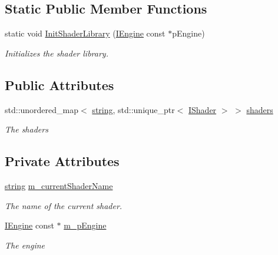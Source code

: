 \subsection*{Static Public Member Functions}
\begin{DoxyCompactItemize}
\item 
static void \hyperlink{struct_shader_library_ac5a116b42faf885357d2118f91d5bb39}{Init\+Shader\+Library} (\hyperlink{class_i_engine}{I\+Engine} const $\ast$p\+Engine)
\begin{DoxyCompactList}\small\item\em Initializes the shader library. \end{DoxyCompactList}\end{DoxyCompactItemize}
\subsection*{Public Attributes}
\begin{DoxyCompactItemize}
\item 
std\+::unordered\+\_\+map$<$ \hyperlink{_types_8h_ad453f9f71ce1f9153fb748d6bb25e454}{string}, std\+::unique\+\_\+ptr$<$ \hyperlink{class_i_shader}{I\+Shader} $>$ $>$ \hyperlink{struct_shader_library_a97d6d708c2c947faefadf03ba1089f01}{shaders}
\begin{DoxyCompactList}\small\item\em The shaders \end{DoxyCompactList}\end{DoxyCompactItemize}
\subsection*{Private Attributes}
\begin{DoxyCompactItemize}
\item 
\hyperlink{_types_8h_ad453f9f71ce1f9153fb748d6bb25e454}{string} \hyperlink{struct_shader_library_a26d1faccd3c7408a99ef4753596e7ee7}{m\+\_\+current\+Shader\+Name}
\begin{DoxyCompactList}\small\item\em The name of the current shader. \end{DoxyCompactList}\item 
\hyperlink{class_i_engine}{I\+Engine} const $\ast$ \hyperlink{struct_shader_library_a55b6f40cf696b902d6826ed4d3acae76}{m\+\_\+p\+Engine}
\begin{DoxyCompactList}\small\item\em The engine \end{DoxyCompactList}\end{DoxyCompactItemize}
